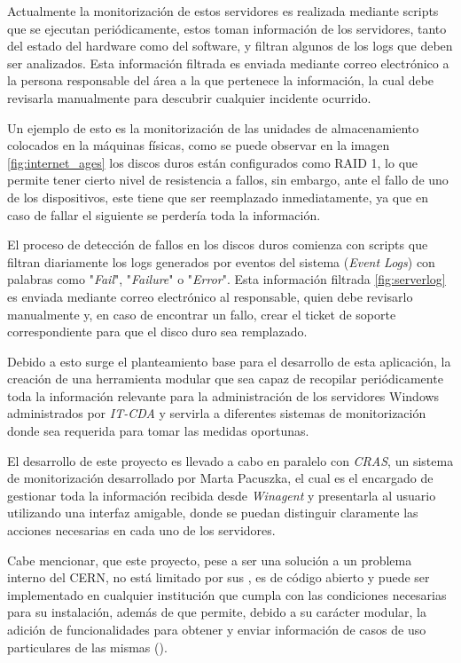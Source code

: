Actualmente la monitorización de estos servidores es realizada mediante scripts que se ejecutan periódicamente, estos toman información de los servidores, tanto del estado del hardware como del software, y filtran algunos de los logs que deben ser analizados. Esta información filtrada es enviada mediante correo electrónico a la persona responsable del área a la que pertenece la información, la cual debe revisarla manualmente para descubrir cualquier incidente ocurrido. 

Un ejemplo de esto es la monitorización de las unidades de almacenamiento colocados en la máquinas físicas, como se puede observar en la imagen \ref{fig:internet_ages} los discos duros están configurados como RAID 1, lo que permite tener cierto nivel de resistencia a fallos, sin embargo, ante el fallo de uno de los dispositivos, este tiene que ser reemplazado inmediatamente, ya que en caso de fallar el siguiente se perdería toda la información.


El proceso de detección de fallos en los discos duros comienza con scripts que filtran diariamente los logs generados por eventos del sistema (\textit{Event Logs}) con palabras como "\textit{Fail}", "\textit{Failure}" o "\textit{Error}". Esta información filtrada \ref{fig:serverlog} es enviada mediante correo electrónico al responsable, quien debe revisarlo manualmente y, en caso de encontrar un fallo, crear el ticket de soporte correspondiente para que el disco duro sea remplazado.


Debido a esto surge el planteamiento base para el desarrollo de esta aplicación, la creación de una herramienta modular que sea capaz de recopilar periódicamente toda la información relevante para la administración de los servidores Windows administrados por \textit{IT-CDA} y servirla a diferentes sistemas de monitorización donde sea requerida para tomar las medidas oportunas.

El desarrollo de este proyecto es llevado a cabo en paralelo con \textit{CRAS}, un sistema de monitorización desarrollado por Marta Pacuszka, el cual es el encargado de gestionar toda la información recibida desde \textit{Winagent} y presentarla al usuario utilizando una interfaz amigable, donde se puedan distinguir claramente las acciones necesarias en cada uno de los servidores.

Cabe mencionar, que este proyecto, pese a ser una solución a un problema interno del CERN, no está limitado por sus , es de código abierto y puede ser implementado en cualquier institución que cumpla con las condiciones necesarias para su instalación, además de que permite, debido a su carácter modular, la adición de funcionalidades para obtener y enviar información de casos de uso particulares de las mismas ().

